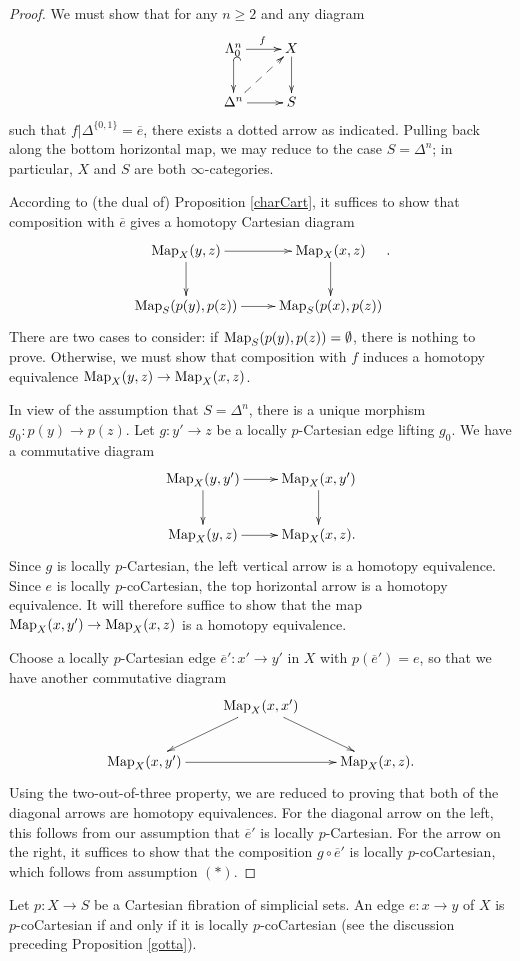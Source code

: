 \begin{proof}
We must show that for any $n \geq 2$ and any diagram
$$ \xymatrix{ \Lambda^n_0 \ar[r]^{f} \ar@{^{(}->}[d] & X \ar[d] \\
\Delta^n \ar[r] \ar@{-->}[ur] & S }$$
such that $f|\Delta^{ \{0,1\} }=\overline{e}$, there exists a dotted arrow as indicated. Pulling back along the bottom horizontal map, we may reduce to the case $S = \Delta^n$; in particular, $X$ and
$S$ are both $\infty$-categories.

According to (the dual of) Proposition \ref{charCart}, it suffices to show that composition with $\overline{e}$ gives a homotopy Cartesian diagram
$$ \xymatrix{ \bHom_{X}(y,z) \ar[r] \ar[d] & \bHom_{X}(x,z) \ar[d] \\
\bHom_{S}(p(y),p(z)) \ar[r] & \bHom_{S}(p(x),p(z))}.$$
There are two cases to consider: if $\operatorname{{Map}}_{S}(p(y), p(z)) = \emptyset$, there is nothing to prove. Otherwise, we must show that composition with $f$ induces a homotopy equivalence $\operatorname{{Map}}_{X}(y,z) \rightarrow \operatorname{{Map}}_{X}(x,z)$.

In view of the assumption that $S = \Delta^n$, there is a unique morphism $g_0: p(y) \rightarrow p(z)$. Let $g: y' \rightarrow z$ be a locally $p$-Cartesian edge lifting $g_0$. We have a commutative diagram
$$ \xymatrix{ \bHom_{X}(y,y') \ar[r] \ar[d] & \bHom_{X}(x,y') \ar[d] \\
\bHom_{X}(y,z) \ar[r] & \bHom_{X}(x,z). }$$
Since $g$ is locally $p$-Cartesian, the left vertical arrow is a homotopy equivalence. Since
$e$ is locally $p$-coCartesian, the top horizontal arrow is a homotopy equivalence. It will therefore suffice to show that the map $\operatorname{{Map}}_{X}(x,y') \rightarrow \operatorname{{Map}}_{X}(x,z)$ is a homotopy equivalence.

Choose a locally $p$-Cartesian edge $\overline{e}': x' \rightarrow y'$ in $X$ with $p( \overline{e}')=e$, so that we have another commutative diagram
$$ \xymatrix{ & \bHom_{X}(x,x') \ar[dl] \ar[dr] & \\
\bHom_{X}(x,y') \ar[rr] & & \bHom_{X}(x,z). }$$
Using the two-out-of-three property, we are reduced to proving that both of the diagonal
arrows are homotopy equivalences. For the diagonal arrow on the left, this follows from our assumption that $\overline{e}'$ is locally $p$-Cartesian. For the arrow on the right, it suffices to show that the composition $g \circ \overline{e}'$ is locally $p$-coCartesian, which follows
from assumption $(\ast)$.
\end{proof}

\begin{corollary}\label{grutt1}
Let $p: X \rightarrow S$ be a Cartesian fibration of simplicial sets. An edge $e: x \rightarrow y$ of $X$ is $p$-coCartesian if and only if it is locally $p$-coCartesian (see the discussion preceding Proposition \ref{gotta}).
\end{corollary}

